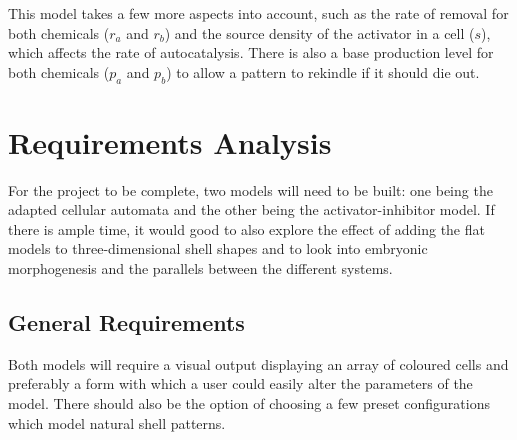 \documentclass[a4paper,11pt]{report}
\begin{document}
This model takes a few more aspects into account, such as the rate of removal for both chemicals ($r_a$ and $r_b$) and the source density of the activator in a cell ($s$), which affects the rate of autocatalysis. There is also a base production level for both chemicals ($p_a$ and $p_b$) to allow a pattern to rekindle if it should die out.


\chapter{Requirements Analysis}
For the project to be complete, two models will need to be built: one being the adapted cellular automata and the other being the activator-inhibitor model. If there is ample time, it would good to also explore the effect of adding the flat models to three-dimensional shell shapes and to look into embryonic morphogenesis and the parallels between the different systems.

\section{General Requirements}
Both models will require a visual output displaying an array of coloured cells and preferably a form with which a user could easily alter the parameters of the model. There should also be the option of choosing a few preset configurations which model natural shell patterns.

\end{document}
